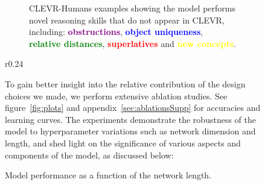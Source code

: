 \documentclass[fleqn]{article}
\newcommand{\figref}[1]{figure~\ref{fig:#1}}
\newcommand{\appref}[1]{appendix~\ref{sec:#1}}
\begin{document}
\begin{figure}[t]
\begin{minipage}{0.55\textwidth}
\begin{figure}[t]
\captionsetup[subfloat]{justification=raggedright, font=scriptsize,labelformat=empty,textfont=it}
\centering
{}
\hfill
{}
\hfill
{}
\hfill
{}
\hfill
{}
\caption{CLEVR-Humans examples showing the model performs novel reasoning skills that do not appear in CLEVR, including: \textcolor{purple}{\textbf{obstructions}}, \textcolor{blue}{\textbf{object uniqueness}}, \textcolor{green}{\textbf{relative distances}}, \textcolor{red}{\textbf{superlatives}} and \textcolor{yellow}{\textbf{new concepts}}. }
\label{hexample}
\label{fig:hexample}
\end{figure}

\begin{wrapfigure}[11]{r}{0.24\textwidth}
\centering
\vspace{-8mm}

\centering
{}

\vspace{-2mm}
\caption{Model performance as a function of the network length. }
\end{wrapfigure}

To gain better insight into the relative contribution of the design choices we made, we perform extensive ablation studies. See \figref{plots} and \appref{ablationsSupp} for accuracies and learning curves. The experiments demonstrate the robustness of the model to hyperparameter variations such as network dimension and length, and shed light on the significance of various aspects and components of the model, as discussed below:


\end{minipage}
\end{figure}
\end{document}
